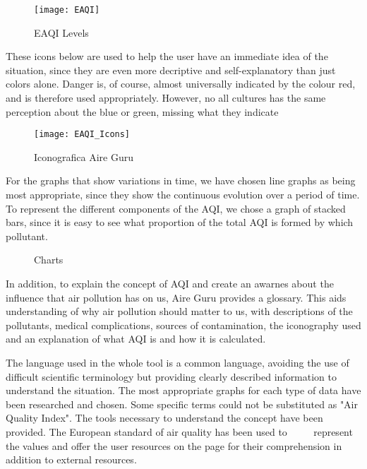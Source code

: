 \begin{figure}[ht]
    \centering
    \texttt{[image: EAQI]}
    \caption{EAQI Levels}
\end{figure}

These icons below are used to help the user have an immediate idea of the situation, since they are even more
decriptive and self-explanatory than just colors alone. Danger is, of course, almost universally indicated by 
the colour red, and is therefore used appropriately. However, no all cultures has the same perception about
the blue or green, missing what they indicate\\

\begin{figure}[ht]
    \centering
    \texttt{[image: EAQI\_Icons]}
    \caption{Iconografica Aire Guru}
\end{figure}

For the graphs that show variations in time,  we have chosen line graphs as being most appropriate,
since they show the continuous evolution over a period of time. To represent the different components of the AQI, we chose a
graph of stacked bars, since it is easy to see what proportion of the total AQI is formed by which pollutant. \\

\begin{figure}[ht]
    \centering
        \hfill
    \caption{Charts}
\end{figure}

In addition, to explain the concept of AQI and create an awarnes about the influence that air pollution has on us, Aire Guru provides a
glossary. This aids understanding of why air pollution should matter to us, with descriptions of the pollutants, medical complications, sources of contamination, the iconography used and
an explanation of what AQI is and how it is calculated. \\

\begin{itemize}
    \done The language used in the whole tool is a common language, avoiding the use of difficult scientific terminology but providing clearly described information to understand the situation.
    \done The most appropriate graphs for each type of data have been researched and chosen.
    \crossed Some specific terms could not be substituted as "Air Quality Index".
    \done The tools necessary to understand the concept have been provided. The European standard of air quality has been used to
         represent the values and offer the user resources on the page for their comprehension in addition to external resources.
\end{itemize}